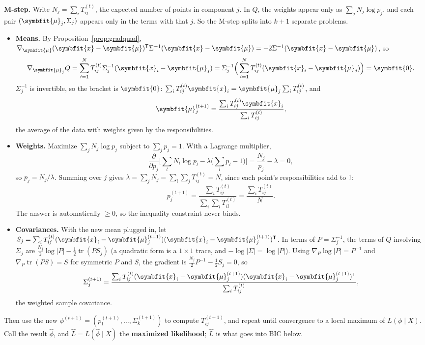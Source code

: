 \documentclass[11pt]{article}
\newcommand{\bm}[1]{\symbfit{#1}}
\newcommand{\vx}{\bm{x}}
\newcommand{\T}{^{\mathsf T}}
\begin{document}
\textbf{M-step.} Write $N_j=\sum_iT_{ij}^{(t)}$, the expected number of points in component $j$. In $Q$, the weights appear only as $\sum_jN_j\log p_j$, and each pair $(\bm\mu_j,\Sigma_j)$ appears only in the terms with that $j$. So the M-step splits into $k+1$ separate problems.
\begin{itemize}[leftmargin=*]
\item \textbf{Means.} By Proposition~\ref{prop:gradquad}, $\nabla_{\bm\mu}(\vx-\bm\mu)\T\Sigma^{-1}(\vx-\bm\mu)=-2\Sigma^{-1}(\vx-\bm\mu)$, so
\[
\nabla_{\bm\mu_j}Q=\sum_{i=1}^NT_{ij}^{(t)}\Sigma_j^{-1}(\vx_i-\bm\mu_j)=\Sigma_j^{-1}\Big(\sum_{i=1}^NT_{ij}^{(t)}(\vx_i-\bm\mu_j)\Big)=\bm0 .
\]
$\Sigma_j^{-1}$ is invertible, so the bracket is $\bm0$: $\sum_iT_{ij}^{(t)}\vx_i=\bm\mu_j\sum_iT_{ij}^{(t)}$, and
\[
\bm\mu_j^{(t+1)}=\frac{\sum_{i}T_{ij}^{(t)}\vx_i}{\sum_{i}T_{ij}^{(t)}},
\]
the average of the data with weights given by the responsibilities.
\item \textbf{Weights.} Maximize $\sum_jN_j\log p_j$ subject to $\sum_jp_j=1$. With a Lagrange multiplier,
\[
\frac{\partial}{\partial p_j}\Big[\sum_lN_l\log p_l-\lambda\Big(\sum_lp_l-1\Big)\Big]=\frac{N_j}{p_j}-\lambda=0,
\]
so $p_j=N_j/\lambda$. Summing over $j$ gives $\lambda=\sum_jN_j=\sum_i\sum_jT_{ij}^{(t)}=N$, since each point's responsibilities add to $1$:
\[
p_j^{(t+1)}=\frac{\sum_iT_{ij}^{(t)}}{\sum_i\sum_lT_{il}^{(t)}}=\frac{\sum_iT_{ij}^{(t)}}N .
\]
The answer is automatically $\ge0$, so the inequality constraint never binds.
\item \textbf{Covariances.} With the new mean plugged in, let $S_j=\sum_iT_{ij}^{(t)}(\vx_i-\bm\mu_j^{(t+1)})(\vx_i-\bm\mu_j^{(t+1)})\T$. In terms of $P=\Sigma_j^{-1}$, the terms of $Q$ involving $\Sigma_j$ are $\frac{N_j}2\log|P|-\frac12\operatorname{tr}(PS_j)$ (a quadratic form is a $1\times1$ trace, and $-\log|\Sigma|=\log|P|$). Using $\nabla_P\log|P|=P^{-1}$ and $\nabla_P\operatorname{tr}(PS)=S$ for symmetric $P$ and $S$, the gradient is $\frac{N_j}2P^{-1}-\frac12S_j=0$, so
\[
\Sigma_j^{(t+1)}=\frac{\sum_iT_{ij}^{(t)}(\vx_i-\bm\mu_j^{(t+1)})(\vx_i-\bm\mu_j^{(t+1)})\T}{\sum_iT_{ij}^{(t)}},
\]
the weighted sample covariance.
\end{itemize}
Then use the new $\phi^{(t+1)}=(p_1^{(t+1)},\dots,\Sigma_k^{(t+1)})$ to compute $T_{ij}^{(t+1)}$, and repeat until convergence to a local maximum of $L(\phi\mid X)$. Call the result $\widehat\phi$, and $\widehat L=L(\widehat\phi\mid X)$ the \textbf{maximized likelihood}; $\widehat L$ is what goes into BIC below.
\end{document}
